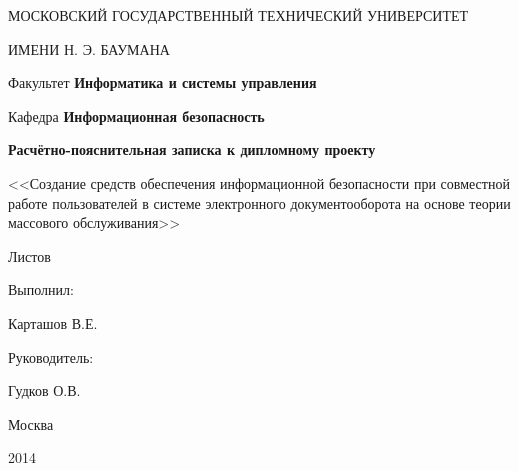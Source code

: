 \thispagestyle{empty}

\begin{center}
МОСКОВСКИЙ ГОСУДАРСТВЕННЫЙ ТЕХНИЧЕСКИЙ УНИВЕРСИТЕТ\par
ИМЕНИ Н. Э. БАУМАНА\par 
\par
Факультет \textbf{Информатика и системы управления}\par Кафедра \textbf{Информационная безопасность}
\end{center}

\vspace{20mm}


\vspace{30mm}

\vspace{5mm}
\begin{center}
{\bf \large Расчётно-пояснительная записка к дипломному проекту
\par}



\vspace{10mm}
<<Создание средств обеспечения информационной безопасности при совместной работе пользователей в системе электронного документооборота на основе теории массового обслуживания>>

\vspace{10mm}
{%
Листов \pageref*{LastPage}
}
\end{center}

\vspace{20mm}
\begin{flushright}
Выполнил:

Карташов В.Е.

\end{flushright}

\vspace{10mm}
\begin{flushright}
Руководитель:

Гудков О.В.

\end{flushright}

\vspace{40mm}
\begin{center}
{Москва

2014}
\end{center}

\newpage